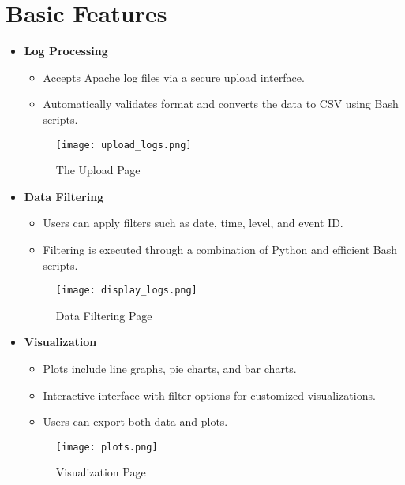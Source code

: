 \documentclass{article}
\begin{document}
\section*{Basic Features}
\begin{itemize}
    \item \textbf{Log Processing}
    \begin{itemize}
        \item Accepts Apache log files via a secure upload interface.
        \item Automatically validates format and converts the data to CSV using Bash scripts.
    \end{itemize}
    \begin{figure}[h]
        \centering
        \texttt{[image: upload\_logs.png]}
        \caption{The Upload Page}
    \end{figure}
    
    \item \textbf{Data Filtering}
    \begin{itemize}
        \item Users can apply filters such as date, time, level, and event ID.
        \item Filtering is executed through a combination of Python and efficient Bash scripts.
    \end{itemize}
    \begin{figure}[h]
        \centering
        \texttt{[image: display\_logs.png]}
        \caption{Data Filtering Page}
    \end{figure}
    
    \item \textbf{Visualization}
    \begin{itemize}
        \item Plots include line graphs, pie charts, and bar charts.
        \item Interactive interface with filter options for customized visualizations.
        \item Users can export both data and plots.
    \end{itemize}
    \begin{figure}[h]
        \centering
        \texttt{[image: plots.png]}
        \caption{Visualization Page}
    \end{figure}
\end{itemize}
\end{document}
